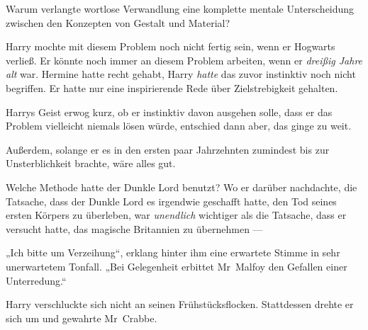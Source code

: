 Warum verlangte wortlose Verwandlung eine komplette mentale Unterscheidung zwischen den Konzepten von Gestalt und Material?

Harry mochte mit diesem Problem noch nicht fertig sein, wenn er Hogwarts verließ. Er könnte noch immer an diesem Problem arbeiten, wenn er \emph{dreißig Jahre alt} war. Hermine hatte recht gehabt, Harry \emph{hatte} das zuvor instinktiv noch nicht begriffen. Er hatte nur eine inspirierende Rede über Zielstrebigkeit gehalten.

Harrys Geist erwog kurz, ob er instinktiv davon ausgehen solle, dass er das Problem vielleicht niemals lösen würde, entschied dann aber, das ginge zu weit.

Außerdem, solange er es in den ersten paar Jahrzehnten zumindest bis zur Unsterblichkeit brachte, wäre alles gut.

Welche Methode hatte der Dunkle Lord benutzt? Wo er darüber nachdachte, die Tatsache, dass der Dunkle Lord es irgendwie geschafft hatte, den Tod seines ersten Körpers zu überleben, war \emph{unendlich} wichtiger als die Tatsache, dass er versucht hatte, das magische Britannien zu übernehmen —

„Ich bitte um Verzeihung“, erklang hinter ihm eine erwartete Stimme in sehr unerwartetem Tonfall.
„Bei Gelegenheit erbittet Mr~Malfoy den Gefallen einer Unterredung.“

Harry verschluckte sich nicht an seinen Frühstücksflocken. Stattdessen drehte er sich um und gewahrte Mr~Crabbe.

